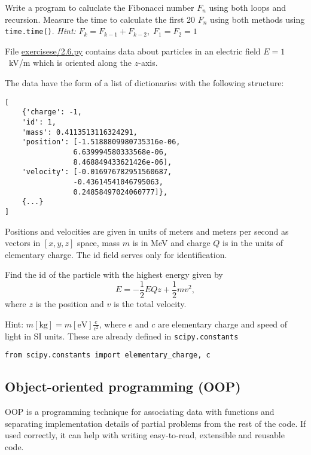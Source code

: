 \begin{exercise}
    Write a program to caluclate the Fibonacci number $F_n$ using both loops and recursion. Measure the time to calculate the first 20 $F_n$ using both methods using \verb|time.time()|.
    \emph{Hint:} $F_k = F_{k-1} + F_{k-2},\;F_1 = F_2 = 1$
\end{exercise}

\begin{exercise}
    File \href{https://raw.githubusercontent.com/emil-varga/NOFY080/refs/heads/main/exercises/e2.6.py}{exercisese/2.6.py} contains data about particles in an electric field $E = 1$~kV/m which is oriented along the $z$-axis.

    The data have the form of a list of dictionaries with the following structure:
\begin{lstlisting}
[
    {'charge': -1,
    'id': 1,
    'mass': 0.4113513116324291,
    'position': [-1.5188809980735316e-06,
                6.639994580333568e-06,
                8.468849433621426e-06],
    'velocity': [-0.016976782951560687,
                -0.43614541046795063,
                0.24858497024060777]},
    {...}
]
\end{lstlisting}
    Positions and velocities are given in units of meters and meters per second as vectors in $[x, y, z]$ space, mass $m$ is in MeV and charge $Q$ is in the units of elementary charge. The id field serves only for identification.

    Find the id of the particle with the highest energy given by
    \[ E = -\frac{1}{2}EQz + \frac{1}{2}m v^2, \]
    where $z$ is the position and $v$ is the total velocity.

    Hint: $m\mathrm{[kg]} = m[\mathrm{eV}] \frac{e}{c^2}$, where $e$ and $c$ are elementary charge and speed of light in SI units. These are already defined in \verb|scipy.constants|
\begin{lstlisting}
from scipy.constants import elementary_charge, c
\end{lstlisting}
\end{exercise}

\subsection{Object-oriented programming (OOP)}
OOP is a programming technique for associating data with functions and separating implementation details of partial problems from the rest of the code. If used correctly, it can help with writing easy-to-read, extensible and reusable code.

